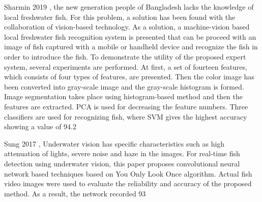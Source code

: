 Sharmin 2019 \cite{Sharmin2019MVB},
the new generation people of Bangladesh lacks the knowledge of local freshwater fish. For this problem, a solution has been found with the collaboration of vision-based technology. As a solution, a machine-vision based local freshwater fish recognition system is presented that can be proceed with an image of fish captured with a mobile or handheld device and recognize the fish in order to introduce the fish. To demonstrate the utility of the proposed expert system, several experiments are performed. At first, a set of fourteen features, which consists of four types of features, are presented. Then the color image has been converted into gray-scale image and the gray-scale histogram is formed. Image segmentation takes place using histogram-based method and then the features are extracted. PCA is used for decreasing the feature numbers. Three classifiers are used for recognizing fish, where SVM gives the highest accuracy showing a value of 94.2%

Sung 2017 \cite{Sung2017VisionBR},
Underwater vision has specific characteristics such as high attenuation of lights, severe noise and haze in the images. For real-time fish detection using underwater vision, this paper proposes convolutional neural network based techniques based on You Only Look Once algorithm. Actual fish video images were used to evaluate the reliability and accuracy of the proposed method. As a result, the network recorded 93%

